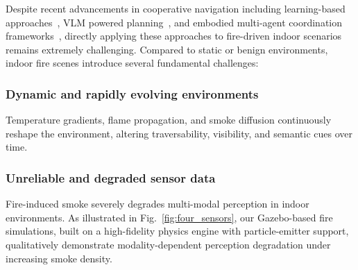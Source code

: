 Despite recent advancements in cooperative navigation including learning-based approaches~\cite{khandelwal2022simple}, VLM powered planning~\cite{11302789}, and embodied multi-agent coordination frameworks~\cite{tan2025roboos}, directly applying these approaches to fire-driven indoor scenarios remains extremely challenging. Compared to static or benign environments, indoor fire scenes introduce several fundamental challenges:

\subsubsection{Dynamic and rapidly evolving environments} 
Temperature gradients, flame propagation, and smoke diffusion continuously reshape the environment, altering traversability, visibility, and semantic cues over time.

\subsubsection{Unreliable and degraded sensor data} 
Fire-induced smoke severely degrades multi-modal perception in indoor environments. 
As illustrated in Fig.~\ref{fig:four_sensors}, our Gazebo-based fire simulations, built on a high-fidelity physics engine with particle-emitter support, qualitatively demonstrate modality-dependent perception degradation under increasing smoke density. 

